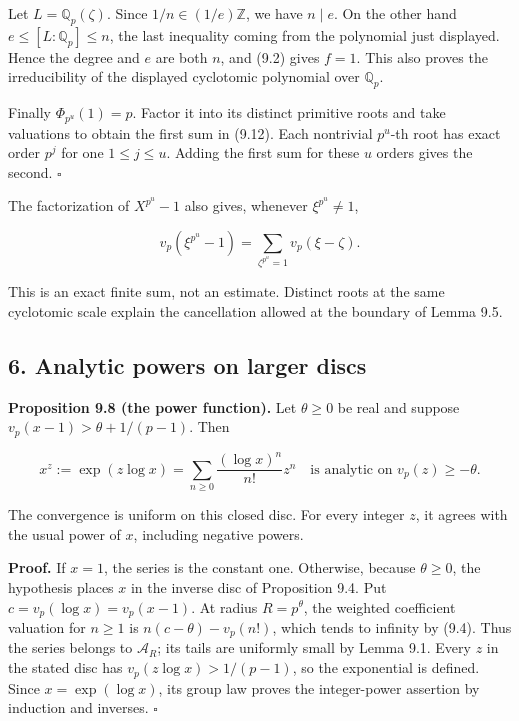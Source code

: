 \documentclass[
  11pt,
  a4paper,
]{article}
\begin{document}
Let \(L=\mathbb Q_p(\zeta)\). Since \(1/n\in(1/e)\mathbb Z\), we have
\(n\mid e\). On the other hand \(e\le[L:\mathbb Q_p]\le n\), the last
inequality coming from the polynomial just displayed. Hence the degree
and \(e\) are both \(n\), and (9.2) gives \(f=1\). This also proves the
irreducibility of the displayed cyclotomic polynomial over
\(\mathbb Q_p\).

Finally \(\Phi_{p^u}(1)=p\). Factor it into its distinct primitive roots
and take valuations to obtain the first sum in (9.12). Each nontrivial
\(p^u\)-th root has exact order \(p^j\) for one \(1\le j\le u\). Adding
the first sum for these \(u\) orders gives the second. \(\square\)

The factorization of \(X^{p^u}-1\) also gives, whenever
\(\xi^{p^u}\ne1\),

\[
v_p(\xi^{p^u}-1)=\sum_{\zeta^{p^u}=1}v_p(\xi-\zeta).
\tag{9.13}
\]

This is an exact finite sum, not an estimate. Distinct roots at the same
cyclotomic scale explain the cancellation allowed at the boundary of
Lemma 9.5.

\subsection{6. Analytic powers on larger
discs}\label{analytic-powers-on-larger-discs}

\textbf{Proposition 9.8 (the power function).} Let \(\theta\ge0\) be
real and suppose \(v_p(x-1)>\theta+1/(p-1)\). Then

\[
x^z:=\exp(z\log x)
=\sum_{n\ge0}\frac{(\log x)^n}{n!}z^n
\quad\text{is analytic on }v_p(z)\ge-\theta.
\tag{9.14}
\]

The convergence is uniform on this closed disc. For every integer \(z\),
it agrees with the usual power of \(x\), including negative powers.

\textbf{Proof.} If \(x=1\), the series is the constant one. Otherwise,
because \(\theta\ge0\), the hypothesis places \(x\) in the inverse disc
of Proposition 9.4. Put \(c=v_p(\log x)=v_p(x-1)\). At radius
\(R=p^\theta\), the weighted coefficient valuation for \(n\ge1\) is
\(n(c-\theta)-v_p(n!)\), which tends to infinity by (9.4). Thus the
series belongs to \(\mathcal A_R\); its tails are uniformly small by
Lemma 9.1. Every \(z\) in the stated disc has \(v_p(z\log x)>1/(p-1)\),
so the exponential is defined. Since \(x=\exp(\log x)\), its group law
proves the integer-power assertion by induction and inverses.
\(\square\)
\end{document}
